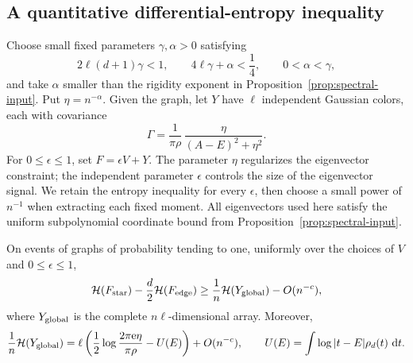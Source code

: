 \subsection{A quantitative differential-entropy inequality}

Choose small fixed parameters \(\gamma,\alpha>0\) satisfying
\begin{equation}\label{eq:ent-parameters}
 2\ell(d+1)\gamma<1,\qquad
 4\ell\gamma+\alpha<\frac14,\qquad
 0<\alpha<\gamma,
\end{equation}
and take \(\alpha\) smaller than the rigidity exponent in
Proposition~\ref{prop:spectral-input}. Put \(\eta=n^{-\alpha}\).
Given the graph, let \(Y\) have \(\ell\) independent Gaussian colors,
each with covariance
\begin{equation}\label{eq:ent-noise}
 \Gamma=\frac{1}{\pi\rho}\,
          \frac{\eta}{(A-E)^2+\eta^2}.
\end{equation}
For \(0\le\epsilon\le1\), set \(F=\epsilon V+Y\).
The parameter \(\eta\) regularizes the eigenvector constraint; the
independent parameter \(\epsilon\) controls the size of the eigenvector
signal. We retain the entropy inequality for every \(\epsilon\), then
choose a small power of \(n^{-1}\) when extracting each fixed moment.
All eigenvectors used here satisfy the uniform subpolynomial
coordinate bound from Proposition~\ref{prop:spectral-input}.

\begin{lemma}\label{ent:star-edge}
On events of graphs of probability tending to one, uniformly over the
choices of \(V\) and \(0\le\epsilon\le1\),
\begin{equation}\label{eq:ent-star-edge}
 \mathcal H(F_{\rm star})-\frac d2\mathcal H(F_{\rm edge})
 \ge \frac1n\mathcal H(Y_{\rm global})-O(n^{-c}),
\end{equation}
where \(Y_{\rm global}\) is the complete \(n\ell\)-dimensional array.
Moreover,
\begin{equation}\label{eq:ent-global-entropy}
 \frac1n\mathcal H(Y_{\rm global})
 =\ell\left(\frac12\log\frac{2\pi{\rm e}\eta}{\pi\rho}
                    -U(E)\right)+O(n^{-c}),
 \qquad
 U(E)=\int\log|t-E|\rho_d(t)\,\,\mathrm d t .
\end{equation}
\end{lemma}

